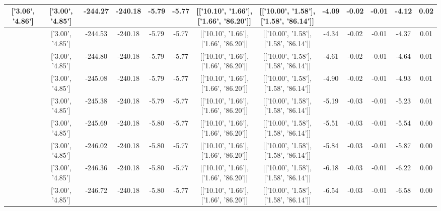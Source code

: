 \begin{table}[htbp]
\begin{adjustbox}{angle=90}
\begin{tabular}{|c|c|c|c|c|c|c|c|c|c|c|c|c|}
 ['3.06', '4.86'] & ['3.00', '4.85'] & -244.27 & -240.18 & -5.79 & -5.77 & [['10.10', '1.66'], ['1.66', '86.20']] & [['10.00', '1.58'], ['1.58', '86.14']] & -4.09 & -0.02 & -0.01 & -4.12 & 0.02\\ \hline
 ['3.07', '4.86'] & ['3.00', '4.85'] & -244.53 & -240.18 & -5.79 & -5.77 & [['10.10', '1.66'], ['1.66', '86.20']] & [['10.00', '1.58'], ['1.58', '86.14']] & -4.34 & -0.02 & -0.01 & -4.37 & 0.01\\ \hline
 ['3.07', '4.86'] & ['3.00', '4.85'] & -244.80 & -240.18 & -5.79 & -5.77 & [['10.10', '1.66'], ['1.66', '86.20']] & [['10.00', '1.58'], ['1.58', '86.14']] & -4.61 & -0.02 & -0.01 & -4.64 & 0.01\\ \hline
 ['3.07', '4.86'] & ['3.00', '4.85'] & -245.08 & -240.18 & -5.79 & -5.77 & [['10.10', '1.66'], ['1.66', '86.20']] & [['10.00', '1.58'], ['1.58', '86.14']] & -4.90 & -0.02 & -0.01 & -4.93 & 0.01\\ \hline
 ['3.08', '4.86'] & ['3.00', '4.85'] & -245.38 & -240.18 & -5.79 & -5.77 & [['10.10', '1.66'], ['1.66', '86.20']] & [['10.00', '1.58'], ['1.58', '86.14']] & -5.19 & -0.03 & -0.01 & -5.23 & 0.01\\ \hline
 ['3.08', '4.86'] & ['3.00', '4.85'] & -245.69 & -240.18 & -5.80 & -5.77 & [['10.10', '1.66'], ['1.66', '86.20']] & [['10.00', '1.58'], ['1.58', '86.14']] & -5.51 & -0.03 & -0.01 & -5.54 & 0.00\\ \hline
 ['3.09', '4.86'] & ['3.00', '4.85'] & -246.02 & -240.18 & -5.80 & -5.77 & [['10.10', '1.66'], ['1.66', '86.20']] & [['10.00', '1.58'], ['1.58', '86.14']] & -5.84 & -0.03 & -0.01 & -5.87 & 0.00\\ \hline
 ['3.09', '4.86'] & ['3.00', '4.85'] & -246.36 & -240.18 & -5.80 & -5.77 & [['10.10', '1.66'], ['1.66', '86.20']] & [['10.00', '1.58'], ['1.58', '86.14']] & -6.18 & -0.03 & -0.01 & -6.22 & 0.00\\ \hline
 ['3.09', '4.86'] & ['3.00', '4.85'] & -246.72 & -240.18 & -5.80 & -5.77 & [['10.10', '1.66'], ['1.66', '86.20']] & [['10.00', '1.58'], ['1.58', '86.14']] & -6.54 & -0.03 & -0.01 & -6.58 & 0.00\\ \hline
            \end{tabular}
        \end{adjustbox}
        \caption{}
        \label{}
    \end{table}
    